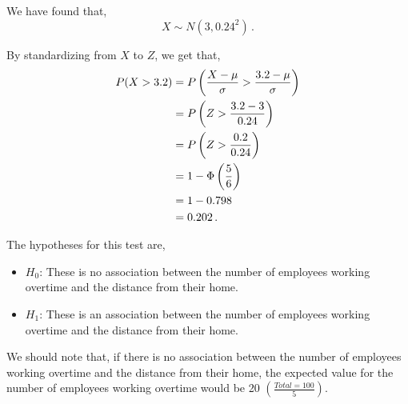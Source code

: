 \begin{subquestions}
\begin{subsubquestions}

\subsubquestion

We have found that,
\begin{equation}
	X \sim N(3,0.24^2) \,.
\end{equation}

By standardizing from $X$ to $Z$, we get that,
\begin{align}
	P(X>3.2) & = P\left(\frac{X-\mu}{\sigma}>\frac{3.2-\mu}{\sigma} \right) \nonumber \\
	         & = P\left(Z>\frac{3.2-3}{0.24} \right) \nonumber \\
	         & = P\left(Z>\frac{0.2}{0.24} \right) \nonumber \\
	         & = 1 - \Phi\left(\frac{5}{6}\right) \nonumber \\
	         & = 1 - 0.798 \nonumber \\
	         & = 0.202 \,.
\end{align}

\end{subsubquestions}


\subquestion

\begin{subsubquestions}
	
\subsubquestion

The hypotheses for this test are,
\begin{itemize}
	\item $H_0$: These is no association between the number of employees working overtime and the distance from their home.
	\item $H_1$: These is an association between the number of employees working overtime and the distance from their home.
\end{itemize}
	

\subsubquestion

We should note that, if there is no association between the number of employees working overtime and the distance from their home, the expected value for the number of employees working overtime would be 20 $(\frac{Total=100}{5})$. 



\end{subsubquestions}
\end{subquestions}
